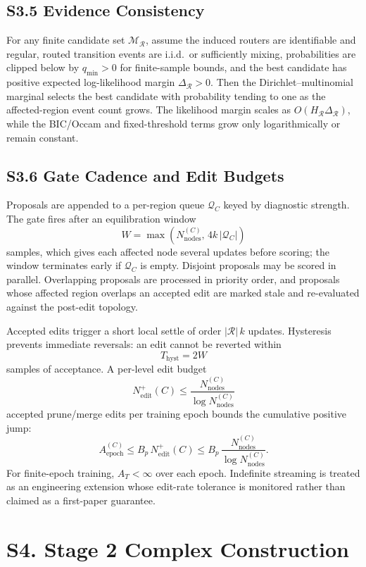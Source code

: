 \documentclass[11pt]{article}
\begin{document}
\subsection*{S3.5 Evidence Consistency}
For any finite candidate set $\mathcal M_{\mathcal R}$, assume the induced routers are identifiable and regular, routed transition events are i.i.d.\ or sufficiently mixing, probabilities are clipped below by $q_{\min}>0$ for finite-sample bounds, and the best candidate has positive expected log-likelihood margin $\Delta_{\mathcal R}>0$. Then the Dirichlet--multinomial marginal selects the best candidate with probability tending to one as the affected-region event count grows. The likelihood margin scales as $O(H_{\mathcal R}\Delta_{\mathcal R})$, while the BIC/Occam and fixed-threshold terms grow only logarithmically or remain constant.

\subsection*{S3.6 Gate Cadence and Edit Budgets}
\label{sec:si-gate-cadence}
Proposals are appended to a per-region queue $\mathcal Q_C$ keyed by diagnostic strength. The gate fires after an equilibration window
\[
W=\max\!\left(N_{\mathrm{nodes}}^{(C)},\,4k\,|\mathcal Q_C|\right)
\label{eq:si-gate-window}
\]
samples, which gives each affected node several updates before scoring; the window terminates early if $\mathcal Q_C$ is empty. Disjoint proposals may be scored in parallel. Overlapping proposals are processed in priority order, and proposals whose affected region overlaps an accepted edit are marked stale and re-evaluated against the post-edit topology.

Accepted edits trigger a short local settle of order $|\mathcal R|\,k$ updates. Hysteresis prevents immediate reversals: an edit cannot be reverted within
\[
T_{\mathrm{hyst}}=2W
\]
samples of acceptance. A per-level edit budget
\[
N_{\mathrm{edit}}^+(C)\le
\frac{N_{\mathrm{nodes}}^{(C)}}{\log N_{\mathrm{nodes}}^{(C)}}
\label{eq:si-edit-budget}
\]
accepted prune/merge edits per training epoch bounds the cumulative positive jump:
\[
A_{\mathrm{epoch}}^{(C)}
\le
B_p\,N_{\mathrm{edit}}^+(C)
\le
B_p\,\frac{N_{\mathrm{nodes}}^{(C)}}{\log N_{\mathrm{nodes}}^{(C)}}.
\]
For finite-epoch training, $A_T<\infty$ over each epoch. Indefinite streaming is treated as an engineering extension whose edit-rate tolerance is monitored rather than claimed as a first-paper guarantee.

\section*{S4. Stage 2 Complex Construction}
\end{document}
